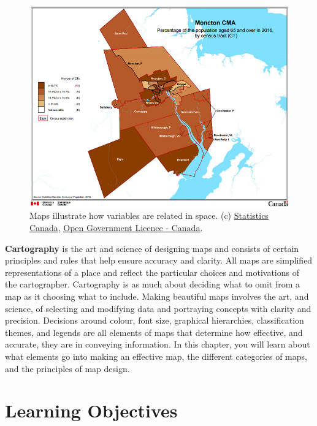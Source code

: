 \documentclass[
]{book}
\begin{document}
\begin{figure}
\centering
\includegraphics{images/17-moncton.png}
\caption{Maps illustrate how variables are related in space. \citep{statistics_canada_thematic_2016} (c) \href{https://www-statcan-gc-ca.eu1.proxy.openathens.net/eng/about/about?MM=as}{Statistics Canada}, \href{https://open.canada.ca/en/open-government-licence-canada}{Open Government Licence - Canada}.}
\end{figure}

\textbf{Cartography} is the art and science of designing maps and consists of certain principles and rules that help ensure accuracy and clarity. All maps are simplified representations of a place and reflect the particular choices and motivations of the cartographer. Cartography is as much about deciding what to omit from a map as it choosing what to include. Making beautiful maps involves the art, and science, of selecting and modifying data and portraying concepts with clarity and precision. Decisions around colour, font size, graphical hierarchies, classification themes, and legends are all elements of maps that determine how effective, and accurate, they are in conveying information. In this chapter, you will learn about what elements go into making an effective map, the different categories of maps, and the principles of map design.

\hypertarget{learning-objectives-16}{%
\section*{Learning Objectives}\label{learning-objectives-16}}
\end{document}
